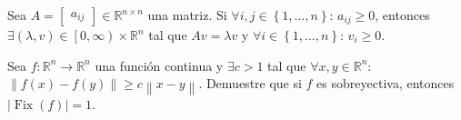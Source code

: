       \begin{solutionordottedlines}
      \end{solutionordottedlines}

      \question

      Sea $A=
      \begin{bmatrix}a_{ij}
      \end{bmatrix}\in\mathbb{R}^{n\times n}$ una matriz.
      Si $\forall i,j\in\left\{1,\dotsc,n\right\}$: $a_{ij}\geq 0$,
      entonces
      \begin{math}
        \exists\left(\lambda,v\right)\in
        \left[0,\infty\right)\times\mathbb{R}^{n}
      \end{math}
      tal que $Av=\lambda v$ y
      $\forall i\in\left\{1,\dotsc,n\right\}$: $v_{i}\geq 0$.

      \begin{solutionordottedlines}
      \end{solutionordottedlines}

      \question

      Sea $f\colon\mathbb{R}^{n}\to\mathbb{R}^{n}$ una función
      continua y $\exists c>1$ tal que $\forall x,y\in\mathbb{R}^{n}$:
      \begin{math}
        \left\|f\left(x\right)-f\left(y\right)\right\|\geq
        c\left\|x-y\right\|
      \end{math}.
      Demuestre que si $f$ es sobreyectiva, entonces
      $\left|\operatorname{Fix}\left(f\right)\right|=1$.

      \question

